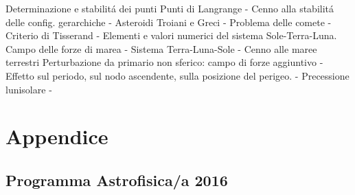 \documentclass[oneside,12pt,fleqn]{memoir}
\begin{document}
Determinazione e stabilit\'a dei punti Punti di Langrange - Cenno alla stabilit\'a delle config. gerarchiche - Asteroidi Troiani e Greci - Problema delle comete - Criterio di Tisserand - Elementi e valori numerici del sistema Sole-Terra-Luna.
Campo delle forze di marea - Sistema Terra-Luna-Sole - Cenno alle maree terrestri
Perturbazione da primario non sferico: campo di forze aggiuntivo - Effetto sul periodo, sul nodo ascendente, sulla posizione del perigeo. - Precessione lunisolare - 


\stopcontents[chapters]


\backmatter

\part{Appendice}

\chapter{Programma Astrofisica/a 2016}
\end{document}
